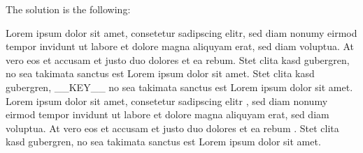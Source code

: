 The solution is the following:
\begin{Solution}
\solitem Lorem ipsum dolor sit amet, consetetur sadipscing elitr, sed diam nonumy eirmod tempor invidunt ut labore et dolore magna aliquyam erat, sed diam voluptua. At vero eos et accusam et justo duo dolores et ea rebum. Stet clita kasd gubergren, no sea takimata sanctus est Lorem ipsum dolor sit amet.
\solitem Stet clita kasd gubergren,  __KEY__ no sea takimata sanctus est Lorem ipsum dolor sit amet. Lorem ipsum dolor sit amet, consetetur sadipscing elitr , sed diam nonumy eirmod tempor invidunt ut labore et dolore magna aliquyam erat, sed diam voluptua. 
\solitem At vero eos et accusam et justo duo dolores et ea rebum . Stet clita kasd gubergren, no sea takimata sanctus est Lorem ipsum dolor sit amet. 
\end{Solution}